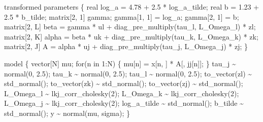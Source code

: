 \documentclass[
  12pt,
  letterpaper,
  DIV=11,
  numbers=noendperiod]{scrartcl}
\newenvironment{Shaded}{\begin{snugshade}}{\end{snugshade}}
\newcommand{\ControlFlowTok}[1]{\textcolor[rgb]{0.00,0.23,0.31}{#1}}
\newcommand{\DataTypeTok}[1]{\textcolor[rgb]{0.68,0.00,0.00}{#1}}
\newcommand{\DecValTok}[1]{\textcolor[rgb]{0.68,0.00,0.00}{#1}}
\newcommand{\FloatTok}[1]{\textcolor[rgb]{0.68,0.00,0.00}{#1}}
\newcommand{\KeywordTok}[1]{\textcolor[rgb]{0.00,0.23,0.31}{#1}}
\newcommand{\NormalTok}[1]{\textcolor[rgb]{0.00,0.23,0.31}{#1}}
\begin{document}
\begin{Shaded}
\begin{Highlighting}[]
\KeywordTok{transformed parameters}\NormalTok{ \{}
  \DataTypeTok{real}\NormalTok{ log\_a = }\FloatTok{4.78}\NormalTok{ + }\FloatTok{2.5}\NormalTok{ * log\_a\_tilde;}
  \DataTypeTok{real}\NormalTok{ b = }\FloatTok{1.23}\NormalTok{ + }\FloatTok{2.5}\NormalTok{ * b\_tilde;}
  \DataTypeTok{matrix}\NormalTok{[}\DecValTok{2}\NormalTok{, }\DecValTok{1}\NormalTok{] gamma;}
\NormalTok{  gamma[}\DecValTok{1}\NormalTok{, }\DecValTok{1}\NormalTok{] = log\_a;}
\NormalTok{  gamma[}\DecValTok{2}\NormalTok{, }\DecValTok{1}\NormalTok{] = b;}
  \DataTypeTok{matrix}\NormalTok{[}\DecValTok{2}\NormalTok{, L] beta = gamma * ul + diag\_pre\_multiply(tau\_l, L\_Omega\_l) * zl;}
  \DataTypeTok{matrix}\NormalTok{[}\DecValTok{2}\NormalTok{, K] alpha = beta * uk + diag\_pre\_multiply(tau\_k, L\_Omega\_k) * zk;}
  \DataTypeTok{matrix}\NormalTok{[}\DecValTok{2}\NormalTok{, J] A = alpha * uj + diag\_pre\_multiply(tau\_j, L\_Omega\_j) * zj;}
\NormalTok{\}}

\KeywordTok{model}\NormalTok{ \{}
 \DataTypeTok{vector}\NormalTok{[N] mu;}
  \ControlFlowTok{for}\NormalTok{(n }\ControlFlowTok{in} \DecValTok{1}\NormalTok{:N) \{}
\NormalTok{    mu[n] = x[n, ] * A[, jj[n]];}
\NormalTok{  \}}
\NormalTok{  tau\_j \textasciitilde{} normal(}\DecValTok{0}\NormalTok{, }\FloatTok{2.5}\NormalTok{);}
\NormalTok{  tau\_k \textasciitilde{} normal(}\DecValTok{0}\NormalTok{, }\FloatTok{2.5}\NormalTok{);}
\NormalTok{  tau\_l \textasciitilde{} normal(}\DecValTok{0}\NormalTok{, }\FloatTok{2.5}\NormalTok{);}
\NormalTok{  to\_vector(zl) \textasciitilde{} std\_normal();}
\NormalTok{  to\_vector(zk) \textasciitilde{} std\_normal();}
\NormalTok{  to\_vector(zj) \textasciitilde{} std\_normal();}
\NormalTok{  L\_Omega\_l \textasciitilde{} lkj\_corr\_cholesky(}\DecValTok{2}\NormalTok{);}
\NormalTok{  L\_Omega\_k \textasciitilde{} lkj\_corr\_cholesky(}\DecValTok{2}\NormalTok{);}
\NormalTok{  L\_Omega\_j \textasciitilde{} lkj\_corr\_cholesky(}\DecValTok{2}\NormalTok{);}
\NormalTok{  log\_a\_tilde \textasciitilde{} std\_normal();}
\NormalTok{  b\_tilde \textasciitilde{} std\_normal();}
\NormalTok{  y \textasciitilde{} normal(mu, sigma);}
\NormalTok{\}}


\end{Highlighting}
\end{Shaded}
\end{document}
